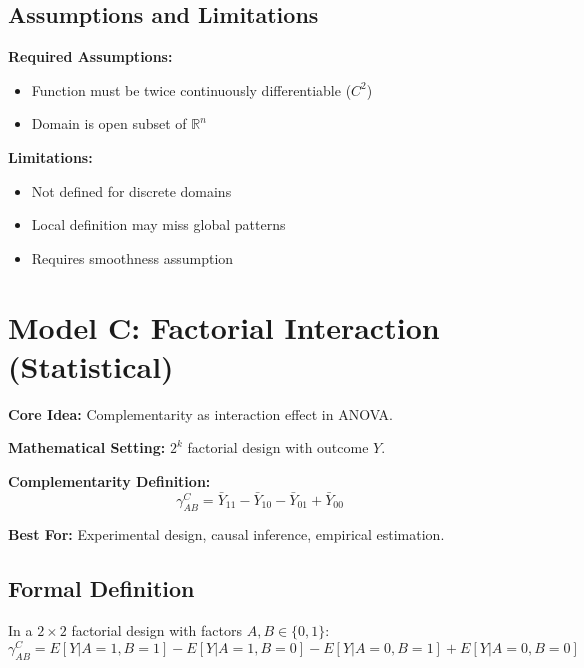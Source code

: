 \subsection{Assumptions and Limitations}

\textbf{Required Assumptions:}
\begin{itemize}
    \item Function must be twice continuously differentiable ($C^2$)
    \item Domain is open subset of $\mathbb{R}^n$
\end{itemize}

\textbf{Limitations:}
\begin{itemize}
    \item Not defined for discrete domains
    \item Local definition may miss global patterns
    \item Requires smoothness assumption
\end{itemize}

\section{Model C: Factorial Interaction (Statistical)}
\label{sec:model-c}

\begin{tcolorbox}[colback=green!5!white,colframe=green!75!black,title=\textbf{Model C Overview}]
\textbf{Core Idea:} Complementarity as interaction effect in ANOVA.

\textbf{Mathematical Setting:} $2^k$ factorial design with outcome $Y$.

\textbf{Complementarity Definition:}
\begin{equation}
\gamma^C_{AB} = \bar{Y}_{11} - \bar{Y}_{10} - \bar{Y}_{01} + \bar{Y}_{00}
\end{equation}

\textbf{Best For:} Experimental design, causal inference, empirical estimation.
\end{tcolorbox}

\subsection{Formal Definition}

\begin{definition}
In a $2 \times 2$ factorial design with factors $A, B \in \{0, 1\}$:
\begin{equation}
\gamma^C_{AB} = E[Y | A=1, B=1] - E[Y | A=1, B=0] - E[Y | A=0, B=1] + E[Y | A=0, B=0]
\label{eq:model-c}
\end{equation}
\end{definition}


